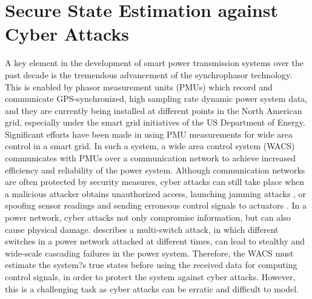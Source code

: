 \documentclass[../thesis.tex]{subfiles}
\begin{document}


\section{Secure State Estimation against Cyber Attacks}

A key element in the development of smart power transmission systems over the past decade is the tremendous advancement of the synchrophasor technology. 
This is enabled by phasor measurement units (PMUs) which record and communicate GPS-synchronized, high sampling rate dynamic power system data, and they are currently being installed at different points in the North American grid, especially under the smart grid initiatives of the US Department of Energy.
Significant efforts have been made in using PMU measurements for wide area control in a smart grid. 
In such a system, a wide area control system (WACS) communicates with PMUs over a communication network to achieve increased efficiency and reliability of the power system.
Although communication networks are often protected by security measures, cyber attacks can still take place when a malicious attacker obtains unauthorized access, launching jamming attacks \cite{Gligor}, or spoofing sensor readings and sending erroneous control signals to actuators \cite{Mo}.
In a power network, cyber attacks not only compromise information, but can also cause physical damage. 
\cite{liu2014coordinated} describes a multi-switch attack, in which different switches in a power network attacked at different times, can lead to stealthy and wide-scale cascading failures in the power system.
Therefore, the WACS must estimate the system?s true states before using the received data for computing control signals, in order to protect the system against cyber attacks.
However, this is a challenging task as cyber attacks can be erratic and difficult to model. 
\end{document}
